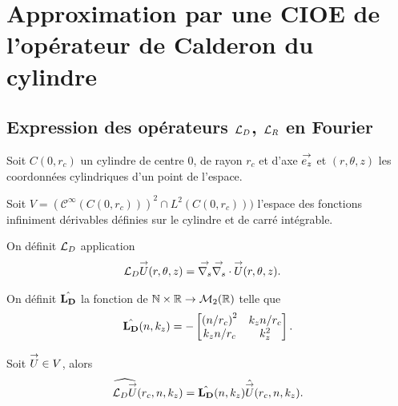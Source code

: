 \section{Approximation par une CIOE de l'opérateur de Calderon du cylindre}

  \subsection[Expression des opérateurs LD, LR en Fourier]{Expression des opérateurs \({\mathcal{L}_D}\), \({\mathcal{L}_R}\) en Fourier}
    Soit \(C(0,r_c)\) un cylindre de centre 0, de rayon \(r_c\) et d'axe \({\overset{\rightarrow}{e_z}}\) et \((r,\theta,z)\) les coordonnées cylindriques d'un point de l'espace.

    Soit \(V = \left(\mathcal{C}^\infty(C(0,r_c))\right)^2 \cap L^2(C(0,r_c)))\) l'espace des fonctions infiniment dérivables définies sur le cylindre et de carré intégrable.

    \begin{defn}
      \label{eq:cylindre:fourier:LD}
      On définit \({\mathcal{L}_D}\) application
      \begin{align*}
        {\mathcal{L}_D} {\overset{\rightarrow}{U}}(r,\theta,z) & = {\overset{\rightarrow}{\nabla_s}}{} {\overset{\rightarrow}{\nabla_s}} \cdot{} {\overset{\rightarrow}{U}}(r,\theta,z).
      \end{align*}

      On définit \(\hat{\mathbf{L_D}}\) la fonction de \(\mathbb N\times\mathbb R \rightarrow \mathcal{M}_2(\mathbb R)\) telle que
      \begin{equation*}
        \hat{\mathbf{L_D}}(n,k_z) = -
        \begin{bmatrix}
          \left({n}\slash{r_c}\right)^2 & k_z{n}\slash{r_c}
          \\
          k_z{n}\slash{r_c} & k_z^2
        \end{bmatrix}.
      \end{equation*}
    \end{defn}

    \begin{prop}
      Soit \({\overset{\rightarrow}{U}} \in V\), alors
      \begin{equation*}
        \widehat{{\mathcal{L}_D} {\overset{\rightarrow}{U}}} (r_c,n,k_z) = \hat{\mathbf{L_D}}(n,k_z) \hat{{\overset{\rightarrow}{U}}}(r_c,n,k_z).
      \end{equation*}
    \end{prop}

